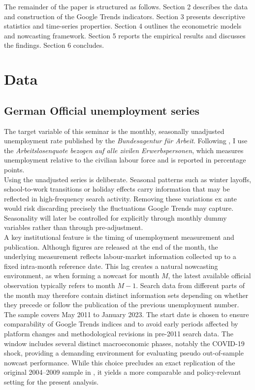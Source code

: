 \documentclass[12pt,a4paper]{article}
\begin{document}
The remainder of the paper is structured as follows. Section 2 describes the data and construction of the Google Trends indicators. Section 3 presents descriptive statistics and time-series properties. Section 4 outlines the econometric models and nowcasting framework. Section 5 reports the empirical results and discusses the findings. Section 6 concludes.




\section{Data}
\subsection{German Official unemployment series}
\label{sec:21}
The target variable of this seminar is the monthly, seasonally unadjusted unemployment rate published by the \textit{Bundesagentur für Arbeit}. Following \citet{Askitas}, I use the \textit{Arbeitslosenquote bezogen auf alle zivilen Erwerbspersonen}, which measures unemployment relative to the civilian labour force and is reported in percentage points.\\
Using the unadjusted series is deliberate. Seasonal patterns such as winter layoffs, school-to-work transitions or holiday effects carry information that may be reflected in high-frequency search activity. Removing these variations ex ante would risk discarding precisely the fluctuations Google Trends may capture. Seasonality will later be controlled for explicitly through monthly dummy variables rather than through pre-adjustment.\\
A key institutional feature is the timing of unemployment measurement and publication. Although figures are released at the end of the month, the underlying measurement reflects labour-market information collected up to a fixed intra-month reference date. This lag creates a natural nowcasting environment, as when forming a nowcast for month $M$, the latest available official observation typically refers to month $M-1$.
Search data from different parts of the month may therefore contain distinct information sets depending on whether they precede or follow the publication of the previous unemployment number.\\
The sample covers May 2011 to January 2023. The start date is chosen to ensure comparability of Google Trends indices and to avoid early periods affected by platform changes and methodological revisions in pre-2011 search data. The window includes several distinct macroeconomic phases, notably the COVID-19 shock, providing a demanding environment for evaluating pseudo out-of-sample nowcast performance. While this choice precludes an exact replication of the original 2004--2009 sample in \citet{Askitas}, it yields a more comparable and policy-relevant setting for the present analysis.
\end{document}

